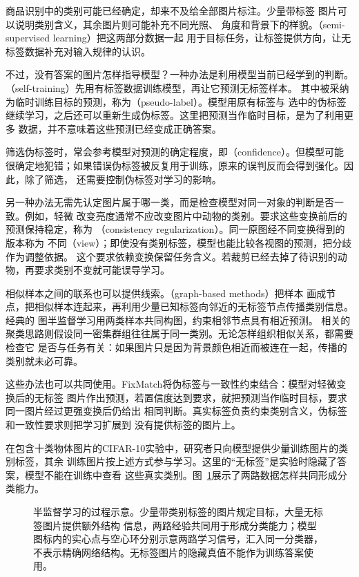 商品识别中的类别可能已经确定，却来不及给全部图片标注。少量带标签
图片可以说明类别含义，其余图片则可能补充不同光照、
角度和背景下的样貌。（semi-supervised learning）把这两部分数据一起
用于目标任务，让标签提供方向，让无标签数据补充对输入规律的认识。

不过，没有答案的图片怎样指导模型？一种办法是利用模型当前已经学到的判断。
（self-training）先用有标签数据训练模型，再让它预测无标签样本。
其中被采纳为临时训练目标的预测，称为（pseudo-label）。模型用原有标签与
选中的伪标签继续学习，之后还可以重新生成伪标签。这里把预测当作临时目标，是为了利用更多
数据，并不意味着这些预测已经变成正确答案。

筛选伪标签时，常会参考模型对预测的确定程度，即（confidence）。但模型可能
很确定地犯错；如果错误伪标签被反复用于训练，原来的误判反而会得到强化。因此，除了筛选，
还需要控制伪标签对学习的影响。

另一种办法无需先认定图片属于哪一类，而是检查模型对同一对象的判断是否一致。例如，轻微
改变亮度通常不应改变图片中动物的类别。要求这些变换前后的预测保持稳定，称为
（consistency regularization）。同一原图经不同变换得到的版本称为
不同（view）；即使没有类别标签，模型也能比较各视图的预测，把分歧作为调整依据。
这个要求依赖变换保留任务含义。若裁剪已经去掉了待识别的动物，再要求类别不变就可能误导学习。

相似样本之间的联系也可以提供线索。（graph-based methods）把样本
画成节点，把相似样本连起来，再利用少量已知标签向邻近的无标签节点传播类别信息。经典的
图半监督学习用两类样本共同构图，约束相邻节点具有相近预测。
相关的聚类思路则假设同一密集群组往往属于同一类别。无论怎样组织相似关系，都需要检查它
是否与任务有关：如果图片只是因为背景颜色相近而被连在一起，传播的类别就未必可靠。

这些办法也可以共同使用。FixMatch将伪标签与一致性约束结合：模型对轻微变换后的无标签
图片作出预测，若置信度达到要求，就把预测当作临时目标，要求同一图片经过更强变换后仍给出
相同判断。真实标签负责约束类别含义，伪标签和一致性要求则把学习扩展到
没有提供标签的图片上。

在包含十类物体图片的CIFAR-10实验中，研究者只向模型提供少量训练图片的类别标签，其余
训练图片按上述方式参与学习。这里的“无标签”是实验时隐藏了答案，模型不能在训练中查看
这些真实类别。图~\ref{fig:semi-supervised-image-process}展示了两路数据怎样共同形成分类能力。

\begin{figure}[!htb]
  \centering
  \caption{半监督学习的过程示意。少量带类别标签的图片规定目标，大量无标签图片提供额外结构
  信息，两路经验共同用于形成分类能力；模型图标内的实心点与空心环分别示意两路学习信号，汇入同一分类器，不表示精确网络结构。无标签图片的隐藏真值不能作为训练答案使用。}
  \label{fig:semi-supervised-image-process}
\end{figure}
\FloatBarrier

